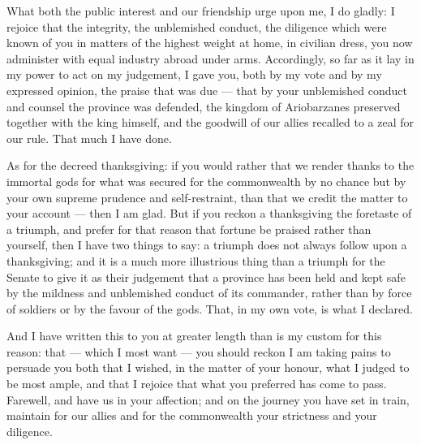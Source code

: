 

 What both the public interest and our friendship urge upon me, I do gladly: I rejoice that the integrity, the unblemished conduct, the diligence which were known of you in matters of the highest weight at home, in civilian dress, you now administer with equal industry abroad under arms. Accordingly, so far as it lay in my power to act on my judgement, I gave you, both by my vote and by my expressed opinion, the praise that was due --- that by your unblemished conduct and counsel the province was defended, the kingdom of Ariobarzanes preserved together with the king himself, and the goodwill of our allies recalled to a zeal for our rule. That much I have done.

 As for the decreed thanksgiving: if you would rather that we render thanks to the immortal gods for what was secured for the commonwealth by no chance but by your own supreme prudence and self-restraint, than that we credit the matter to your account --- then I am glad. But if you reckon a thanksgiving the foretaste of a triumph, and prefer for that reason that fortune be praised rather than yourself, then I have two things to say: a triumph does not always follow upon a thanksgiving; and it is a much more illustrious thing than a triumph for the Senate to give it as their judgement that a province has been held and kept safe by the mildness and unblemished conduct of its commander, rather than by force of soldiers or by the favour of the gods. That, in my own vote, is what I declared.

 And I have written this to you at greater length than is my custom for this reason: that --- which I most want --- you should reckon I am taking pains to persuade you both that I wished, in the matter of your honour, what I judged to be most ample, and that I rejoice that what you preferred has come to pass. Farewell, and have us in your affection; and on the journey you have set in train, maintain for our allies and for the commonwealth your strictness and your diligence.
